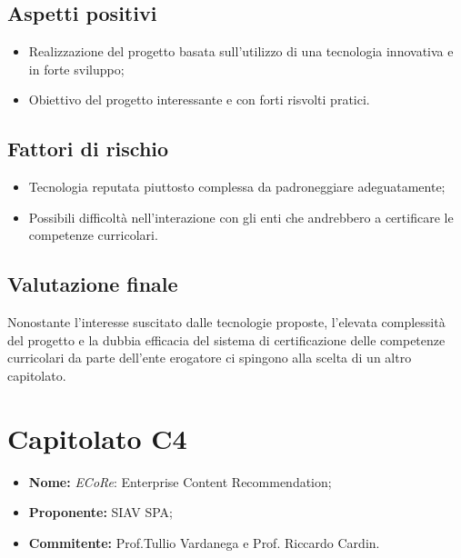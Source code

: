 \documentclass[openany,12pt,a4paper]{report}
\begin{document}
	\subsection{Aspetti positivi}
	
	\begin{itemize}
		\item Realizzazione del progetto basata sull'utilizzo di una tecnologia innovativa e in forte sviluppo;
		
		\item Obiettivo del progetto interessante e con forti risvolti pratici.
	\end{itemize}
	
	\subsection{Fattori di rischio}
	
	\begin{itemize}
		\item Tecnologia reputata piuttosto complessa da padroneggiare adeguatamente;
		
		\item Possibili difficoltà nell'interazione con gli enti che andrebbero a certificare le competenze curricolari.
	\end{itemize}
	
	\subsection{Valutazione finale}
	
	Nonostante l'interesse suscitato dalle tecnologie proposte, l'elevata complessità del progetto e la dubbia efficacia del sistema di certificazione delle competenze curricolari da parte dell'ente erogatore ci spingono alla scelta di un altro capitolato.
	
	
	\section{Capitolato C4}
	
	\begin{itemize}
		\item \textbf{Nome:} \textit{ECoRe}: Enterprise Content Recommendation;
		\item \textbf{Proponente:} SIAV SPA;
		\item \textbf{Commitente:} Prof.Tullio Vardanega e Prof. Riccardo Cardin.
	\end{itemize}
	
\end{document}
